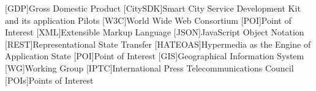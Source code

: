 [GDP]{Gross Domestic Product}
[CitySDK]{Smart City Service Development Kit and its application Pilots}
[W3C]{World Wide Web Consortium}
[POI]{Point of Interest}
[XML]{Extensible Markup Language}
[JSON]{JavaScript Object Notation}
[REST]{Representational State Transfer}
[HATEOAS]{Hypermedia as the Engine of Application State}
[POI]{Point of Interest}
[GIS]{Geographical Information System}
[WG]{Working Group}
[IPTC]{International Press Telecommunications Council}
[POIs]{Points of Interest}

